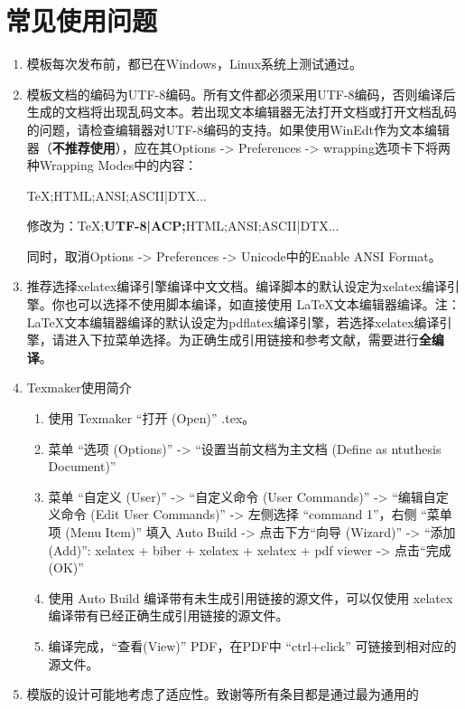
\chapter{常见使用问题}\label{cha:question}

\begin{enumerate}
    \item 模板每次发布前，都已在Windows，Linux系统上测试通过。

    \item 模板文档的编码为UTF-8编码。所有文件都必须采用UTF-8编码，否则编译后生成的文档将出现乱码文本。若出现文本编辑器无法打开文档或打开文档乱码的问题，请检查编辑器对UTF-8编码的支持。如果使用WinEdt作为文本编辑器（\textbf{不推荐使用}），应在其Options -> Preferences -> wrapping选项卡下将两种Wrapping Modes中的内容： 
    
        TeX;HTML;ANSI;ASCII|DTX...
        
        修改为：TeX;\textbf{UTF-8|ACP;}HTML;ANSI;ASCII|DTX...
        
        同时，取消Options -> Preferences -> Unicode中的Enable ANSI Format。

    \item 推荐选择xelatex编译引擎编译中文文档。编译脚本的默认设定为xelatex编译引擎。你也可以选择不使用脚本编译，如直接使用 \LaTeX{}文本编辑器编译。注：\LaTeX{}文本编辑器编译的默认设定为pdflatex编译引擎，若选择xelatex编译引擎，请进入下拉菜单选择。为正确生成引用链接和参考文献，需要进行\textbf{全编译}。

    \item Texmaker使用简介
        \begin{enumerate}
            \footnotesize
            \item 使用 Texmaker “打开 (Open)” \projectname.tex。
            \item 菜单 “选项 (Options)” -> “设置当前文档为主文档 (Define as ntuthesis Document)”
            \item 菜单 “自定义 (User)” -> “自定义命令 (User Commands)” -> “编辑自定义命令 (Edit User Commands)” -> 左侧选择 “command 1”，右侧 “菜单项 (Menu Item)” 填入 Auto Build -> 点击下方“向导 (Wizard)” -> “添加 (Add)”: xelatex + biber + xelatex + xelatex + pdf viewer -> 点击“完成 (OK)”
            \item 使用 Auto Build 编译带有未生成引用链接的源文件，可以仅使用 xelatex 编译带有已经正确生成引用链接的源文件。
            \item 编译完成，“查看(View)” PDF，在PDF中 “ctrl+click” 可链接到相对应的源文件。
        \end{enumerate}
    \item 模版的设计可能地考虑了适应性。致谢等所有条目都是通过最为通用的


\end{enumerate}
